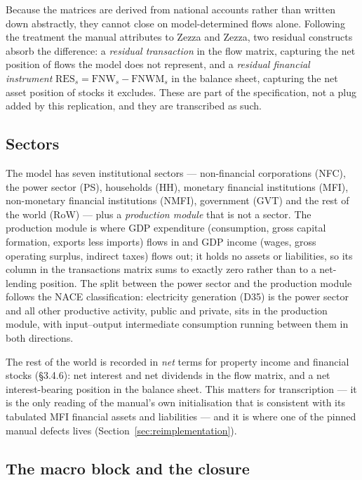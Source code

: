 Because the matrices are derived from national accounts rather than written down abstractly, they cannot close on model-determined flows alone. Following the treatment the manual attributes to Zezza and Zezza, two residual constructs absorb the difference: a \emph{residual transaction} in the flow matrix, capturing the net position of flows the model does not represent, and a \emph{residual financial instrument} $\mathrm{RES}_s = \mathrm{FNW}_s - \mathrm{FNWM}_s$ in the balance sheet, capturing the net asset position of stocks it excludes. These are part of the specification, not a plug added by this replication, and they are transcribed as such.

\subsection{Sectors}

The model has seven institutional sectors --- non-financial corporations (NFC), the power sector (PS), households (HH), monetary financial institutions (MFI), non-monetary financial institutions (NMFI), government (GVT) and the rest of the world (RoW) --- plus a \emph{production module} that is not a sector. The production module is where GDP expenditure (consumption, gross capital formation, exports less imports) flows in and GDP income (wages, gross operating surplus, indirect taxes) flows out; it holds no assets or liabilities, so its column in the transactions matrix sums to exactly zero rather than to a net-lending position. The split between the power sector and the production module follows the NACE classification: electricity generation (D35) is the power sector and all other productive activity, public and private, sits in the production module, with input--output intermediate consumption running between them in both directions.

The rest of the world is recorded in \emph{net} terms for property income and financial stocks (\S3.4.6): net interest and net dividends in the flow matrix, and a net interest-bearing position in the balance sheet. This matters for transcription --- it is the only reading of the manual's own initialisation that is consistent with its tabulated MFI financial assets and liabilities --- and it is where one of the pinned manual defects lives (Section~\ref{sec:reimplementation}).

\subsection{The macro block and the closure}

